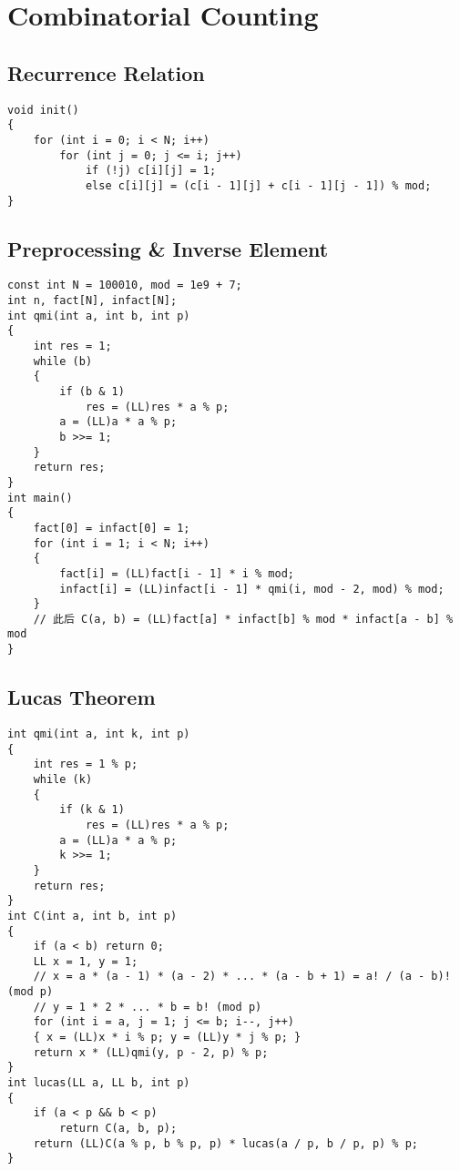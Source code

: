 \section{Combinatorial Counting}
\subsection{Recurrence Relation}
\begin{lstlisting}
void init()
{
    for (int i = 0; i < N; i++)
        for (int j = 0; j <= i; j++)
            if (!j) c[i][j] = 1;
            else c[i][j] = (c[i - 1][j] + c[i - 1][j - 1]) % mod;
}
\end{lstlisting}
\subsection{Preprocessing \& Inverse Element}
\begin{lstlisting}
const int N = 100010, mod = 1e9 + 7;
int n, fact[N], infact[N];
int qmi(int a, int b, int p)
{
    int res = 1;
    while (b)
    {
        if (b & 1)
            res = (LL)res * a % p;
        a = (LL)a * a % p;
        b >>= 1;
    }
    return res;
}
int main()
{
    fact[0] = infact[0] = 1;
    for (int i = 1; i < N; i++)
    {
        fact[i] = (LL)fact[i - 1] * i % mod;
        infact[i] = (LL)infact[i - 1] * qmi(i, mod - 2, mod) % mod;
    }
    // 此后 C(a, b) = (LL)fact[a] * infact[b] % mod * infact[a - b] % mod
}
\end{lstlisting}
\subsection{Lucas Theorem}
\begin{lstlisting}
int qmi(int a, int k, int p)
{
    int res = 1 % p;
    while (k)
    {
        if (k & 1)
            res = (LL)res * a % p;
        a = (LL)a * a % p;
        k >>= 1;
    }
    return res;
}
int C(int a, int b, int p)
{
    if (a < b) return 0;
    LL x = 1, y = 1;
    // x = a * (a - 1) * (a - 2) * ... * (a - b + 1) = a! / (a - b)! (mod p)
    // y = 1 * 2 * ... * b = b! (mod p)
    for (int i = a, j = 1; j <= b; i--, j++)
    { x = (LL)x * i % p; y = (LL)y * j % p; }
    return x * (LL)qmi(y, p - 2, p) % p;
}
int lucas(LL a, LL b, int p)
{
    if (a < p && b < p)
        return C(a, b, p);
    return (LL)C(a % p, b % p, p) * lucas(a / p, b / p, p) % p;
}
\end{lstlisting}
